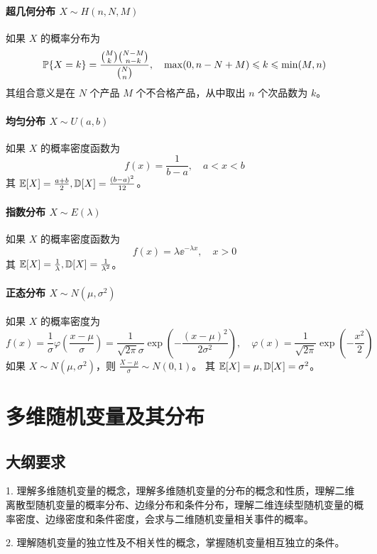 \paragraph{超几何分布 $X \sim H(n, N, M)$}
如果 $X$ 的概率分布为
\[ \mathbb{P}\{X = k\} = \frac{\binom{M}{k} \binom{N - M}{n - k}}{\binom{N}{n}}, \quad \max(0, n - N + M) \leqslant k \leqslant \min(M, n) \]
其组合意义是在 $N$ 个产品 $M$ 个不合格产品，从中取出 $n$ 个次品数为 $k$。

\paragraph{均匀分布 $X \sim U(a, b)$}
如果 $X$ 的概率密度函数为
\[ f(x) = \frac{1}{b - a}, \quad a < x < b \]
其 $\mathbb{E} [X] = \frac{a+b}{2}, \mathbb{D} [X] = \frac{(b-a)^2}{12}$。

\paragraph{指数分布 $X \sim E(\lambda)$}
如果 $X$ 的概率密度函数为
\[ f(x) = \lambda \ee^{-\lambda x}, \quad x > 0 \]
其 $\mathbb{E} [X] = \frac{1}{\lambda}, \mathbb{D} [X] = \frac{1}{\lambda^2}$。

\paragraph{正态分布 $X \sim N(\mu, \sigma^2)$}
如果 $X$ 的概率密度为
\[ f(x) = \frac{1}{\sigma} \varphi\left(\frac{x - \mu}{\sigma}\right) = \frac{1}{\sqrt{2 \pi}  \sigma} \exp \left(- \frac{(x - \mu)^2}{2\sigma^2}  \right), \quad \varphi(x) = \frac{1}{\sqrt{2\pi}} \exp\left(-\frac{x^2}{2}\right) \]
如果 $X \sim N(\mu, \sigma^2)$，则 $\frac{X - \mu}{\sigma} \sim N(0, 1)$。
其 $\mathbb{E} [X] = \mu, \mathbb{D} [X] = \sigma^2$。


\section{多维随机变量及其分布}

\subsection{大纲要求}

1. 理解多维随机变量的概念，理解多维随机变量的分布的概念和性质，理解二维离散型随机变量的概率分布、边缘分布和条件分布，理解二维连续型随机变量的概率密度、边缘密度和条件密度，会求与二维随机变量相关事件的概率。

2. 理解随机变量的独立性及不相关性的概念，掌握随机变量相互独立的条件。

